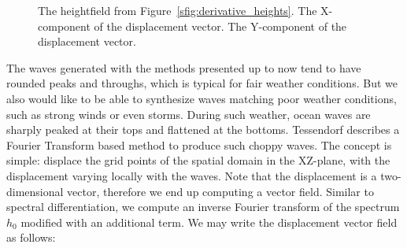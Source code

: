 \begin{figure}
{ }
 \hfill
\caption{The heightfield from 
Figure~\ref{sfig:derivative_heights}. The 
X-component of the displacement vector. The 
Y-component of the displacement vector.}
\label{fig:displacements}
\end{figure}
%
The waves generated with the methods presented up to now tend to have rounded peaks and throughs,
which is typical for fair weather conditions. But we also would like to be able to synthesize waves
matching poor weather conditions, such as strong winds or even storms. During such weather, ocean waves
are sharply peaked at their tops and flattened at the bottoms. Tessendorf\cite{course:simulatingocean}
describes a Fourier Transform based method to produce such choppy waves. The concept is simple: displace
the grid points of the spatial domain in the XZ-plane, with the displacement varying locally with the waves.
Note that the displacement is a two-dimensional vector, therefore we end up computing a vector field.
Similar to spectral differentiation, we compute an inverse Fourier transform of the spectrum $h_0$
modified with an additional term. We may write the displacement vector field as follows:
